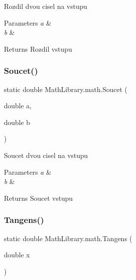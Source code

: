 Rozdil dvou cisel na vstupu 


\begin{DoxyParams}{Parameters}
{\em a} & \\
\hline
{\em b} & \\
\hline
\end{DoxyParams}
\begin{DoxyReturn}{Returns}
Rozdil vstupu
\end{DoxyReturn}
\mbox{\label{class_math_library_1_1math_ad33392c83756895b4a5af417ed69270d}} 
\subsubsection{\texorpdfstring{Soucet()}{Soucet()}}
{\footnotesize\ttfamily static double Math\+Library.\+math.\+Soucet (\begin{DoxyParamCaption}\item[{double}]{a,  }\item[{double}]{b }\end{DoxyParamCaption})\hspace{0.3cm}{\ttfamily [static]}}



Soucet dvou cisel na vstupu 


\begin{DoxyParams}{Parameters}
{\em a} & \\
\hline
{\em b} & \\
\hline
\end{DoxyParams}
\begin{DoxyReturn}{Returns}
Soucet vstupu
\end{DoxyReturn}
\mbox{\label{class_math_library_1_1math_a389c42a9997236b24c2b0af1c43c625d}} 
\subsubsection{\texorpdfstring{Tangens()}{Tangens()}}
{\footnotesize\ttfamily static double Math\+Library.\+math.\+Tangens (\begin{DoxyParamCaption}\item[{double}]{x }\end{DoxyParamCaption})\hspace{0.3cm}{\ttfamily [static]}}



